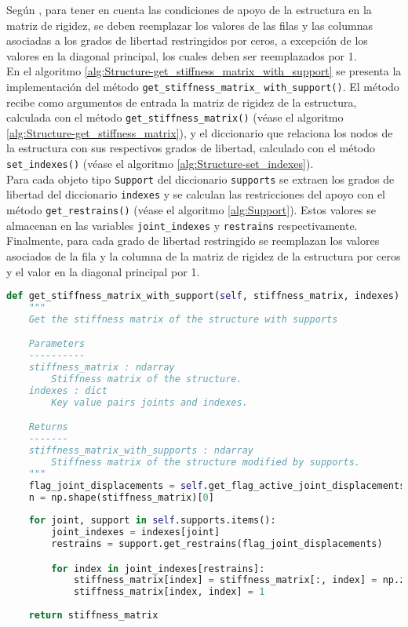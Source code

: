 Según \cite{reddy1993an}, para tener en cuenta las condiciones de apoyo de la estructura en la matriz de rigidez, se deben reemplazar los valores de las filas y las columnas asociadas a los grados de libertad restringidos por ceros, a excepción de los valores en la diagonal principal, los cuales deben ser reemplazados por 1.\\

En el algoritmo \ref{alg:Structure-get_stiffness_matrix_with_support} se presenta la implementación del método \verb|get_stiffness_matrix_| \verb|with_support()|. El método recibe como argumentos de entrada la matriz de rigidez de la estructura, calculada con el método \verb|get_stiffness_matrix()| (véase el algoritmo \ref{alg:Structure-get_stiffness_matrix}), y el diccionario que relaciona los nodos de la estructura con sus respectivos grados de libertad, calculado con el método \verb|set_indexes()| (véase el algoritmo \ref{alg:Structure-set_indexes}).\\

Para cada objeto tipo \verb|Support| del diccionario \verb|supports| se extraen los grados de libertad del diccionario \verb|indexes| y se calculan las restricciones del apoyo con el método \verb|get_restrains()| (véase el algoritmo \ref{alg:Support}). Estos valores se almacenan en las variables \verb|joint_indexes| y \verb|restrains| respectivamente.\\

Finalmente, para cada grado de libertad restringido se reemplazan los valores asociados de la fila y la columna de la matriz de rigidez de la estructura por ceros y el valor en la diagonal principal por 1.\\

\begin{lstlisting}[language=Python,caption=Método \texttt{get\_stiffness\_matrix\_with\_support()} de la clase \texttt{Structure}.,label=alg:Structure-get_stiffness_matrix_with_support, frame=single]
def get_stiffness_matrix_with_support(self, stiffness_matrix, indexes):
    """
    Get the stiffness matrix of the structure with supports

    Parameters
    ----------
    stiffness_matrix : ndarray
        Stiffness matrix of the structure.
    indexes : dict
        Key value pairs joints and indexes.

    Returns
    -------
    stiffness_matrix_with_supports : ndarray
        Stiffness matrix of the structure modified by supports.
    """
    flag_joint_displacements = self.get_flag_active_joint_displacements()
    n = np.shape(stiffness_matrix)[0]
    
    for joint, support in self.supports.items():
        joint_indexes = indexes[joint]
        restrains = support.get_restrains(flag_joint_displacements)

        for index in joint_indexes[restrains]:
            stiffness_matrix[index] = stiffness_matrix[:, index] = np.zeros(n)
            stiffness_matrix[index, index] = 1
    
    return stiffness_matrix
\end{lstlisting}

